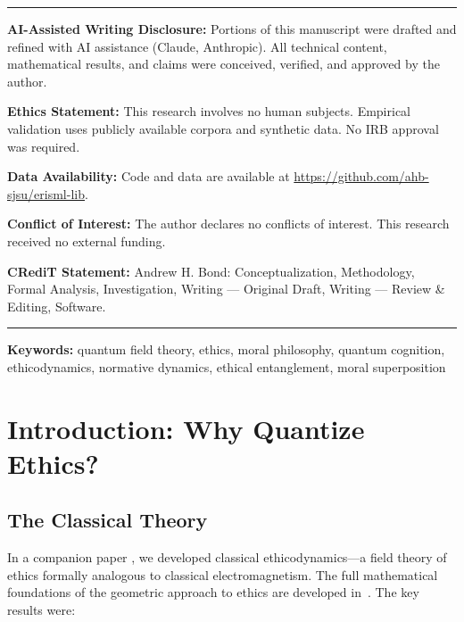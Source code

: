 \documentclass[12pt]{article}
\begin{document}
\begin{titlepage}
\vfill

\noindent\rule{\linewidth}{0.4pt}
\small
\noindent\textbf{AI-Assisted Writing Disclosure:} Portions of this manuscript were drafted and refined with AI assistance (Claude, Anthropic). All technical content, mathematical results, and claims were conceived, verified, and approved by the author.

\noindent\textbf{Ethics Statement:} This research involves no human subjects. Empirical validation uses publicly available corpora and synthetic data. No IRB approval was required.

\noindent\textbf{Data Availability:} Code and data are available at \url{https://github.com/ahb-sjsu/erisml-lib}.

\noindent\textbf{Conflict of Interest:} The author declares no conflicts of interest. This research received no external funding.

\noindent\textbf{CRediT Statement:} Andrew H. Bond: Conceptualization, Methodology, Formal Analysis, Investigation, Writing --- Original Draft, Writing --- Review \& Editing, Software.
\noindent\rule{\linewidth}{0.4pt}
\normalsize

\end{titlepage}

\noindent\textbf{Keywords:} quantum field theory, ethics, moral philosophy, quantum cognition, ethicodynamics, normative dynamics, ethical entanglement, moral superposition

\tableofcontents

\newpage

\section{Introduction: Why Quantize Ethics?}

\subsection{The Classical Theory}

In a companion paper \cite{bond2025noether}, we developed classical ethicodynamics---a field theory of ethics formally analogous to classical electromagnetism. The full mathematical foundations of the geometric approach to ethics are developed in~\cite{bond2026ge}. The key results were:
\end{document}
